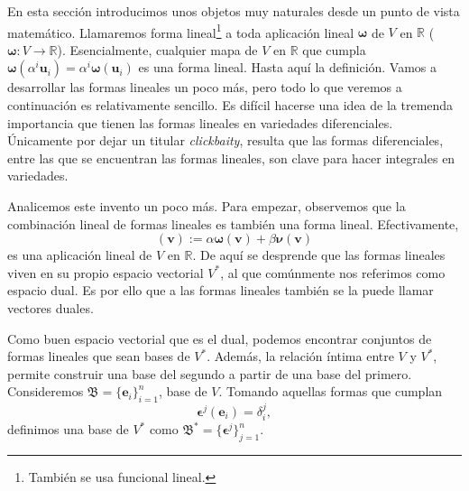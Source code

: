 En esta sección introducimos unos objetos muy naturales desde un punto de vista matemático. Llamaremos forma lineal\footnote{También se usa funcional lineal.} a toda aplicación lineal \(\boldsymbol{\omega}\) de \(V\) en \(\mathbb{R}\) (\(\boldsymbol{\omega}:V\rightarrow\mathbb{R}\)). Esencialmente, cualquier mapa de \(V\) en \(\mathbb{R}\) que cumpla \(\boldsymbol{\omega}(\alpha^i\mathbf{u}_i) = \alpha^i\boldsymbol{\omega}(\mathbf{u}_i)\) es una forma lineal. Hasta aquí la definición. Vamos a desarrollar las formas lineales un poco más, pero todo lo que veremos a continuación es relativamente sencillo. Es difícil hacerse una idea de la tremenda importancia que tienen las formas lineales en variedades diferenciales. Únicamente por dejar un titular \textit{clickbaity}, resulta que las formas diferenciales, entre las que se encuentran las formas lineales, son clave para hacer integrales en variedades.

Analicemos este invento un poco más. Para empezar, observemos que la combinación lineal de formas lineales es también una forma lineal. Efectivamente, 
\begin{equation*}
    [\alpha\boldsymbol{\omega} + \beta\boldsymbol{\nu}](\mathbf{v}) := \alpha\boldsymbol{\omega}(\mathbf{v}) + \beta\boldsymbol{\nu}(\mathbf{v})
\end{equation*}
es una aplicación lineal de \(V\) en \(\mathbb{R}\). De aquí se desprende que las formas lineales viven en su propio espacio vectorial \(V^*\), al que comúnmente nos referimos como espacio dual. Es por ello que a las formas lineales también se la puede llamar vectores duales.

Como buen espacio vectorial que es el dual, podemos encontrar conjuntos de formas lineales que sean bases de \(V^*\). Además, la relación íntima entre \(V\) y \(V^*\), permite construir una base del segundo a partir de una base del primero. Consideremos \(\mathfrak{B}=\{\mathbf{e}_i\}_{i=1}^n\), base de \(V\). Tomando aquellas formas que cumplan 
\begin{equation}
    \label{eq.2-basedual}
    \boldsymbol{\epsilon}^j(\mathbf{e}_i) = \delta_{i}^j, 
\end{equation}
definimos una base de \(V^*\) como \(\mathfrak{B}^*=\{\boldsymbol{\epsilon}^j\}_{j=1}^n\).  

